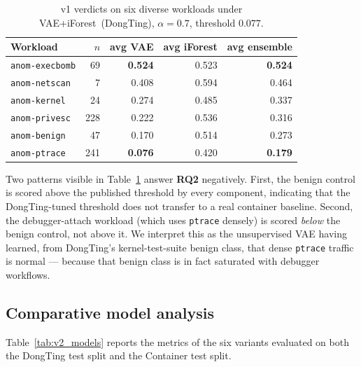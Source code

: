 \begin{table}[!t]
\centering
\caption{v1 verdicts on six diverse workloads under
VAE+iForest~(DongTing), $\alpha=0.7$, threshold $0.077$.}
\label{tab:diversity}
\begin{tabular}{lrrrr}
\toprule
Workload         & $n$ & avg VAE & avg iForest & avg ensemble \\
\midrule
\texttt{anom-execbomb}  & 69  & \textbf{0.524} & 0.523 & \textbf{0.524} \\
\texttt{anom-netscan}   & 7   & 0.408          & 0.594 & 0.464          \\
\texttt{anom-kernel}    & 24  & 0.274          & 0.485 & 0.337          \\
\texttt{anom-privesc}   & 228 & 0.222          & 0.536 & 0.316          \\
\texttt{anom-benign}    & 47  & 0.170          & 0.514 & 0.273          \\
\texttt{anom-ptrace}    & 241 & \textbf{0.076} & 0.420 & \textbf{0.179} \\
\bottomrule
\end{tabular}
\end{table}

Two patterns visible in Table~\ref{tab:diversity} answer
\textbf{RQ2} negatively. First, the benign control is scored above
the published threshold by every component, indicating that the
DongTing-tuned threshold does not transfer to a real container
baseline. Second, the debugger-attach workload (which uses
\texttt{ptrace} densely) is scored \emph{below} the benign control,
not above it. We interpret this as the unsupervised VAE having
learned, from DongTing's kernel-test-suite benign class, that dense
\texttt{ptrace} traffic is normal --- because that benign class is
in fact saturated with debugger workflows.

\subsection{Comparative model analysis}
\label{subsec:comparative}
Table~\ref{tab:v2_models} reports the metrics of the six variants
evaluated on both the DongTing test split and the Container test
split.

